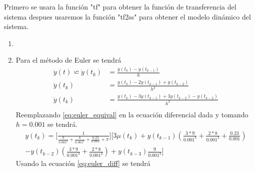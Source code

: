 \documentclass[12pt]{article}
\begin{document}
\begin{enumerate}
        
    Primero se usara la función "tf" para obtener la función de transferencia del sistema despues usaremos la función "tf2ss" para obtener el modelo dinámico del sistema.
    \begin{enumerate}
        \item 
        

        
        \item Para el método de Euler se tendrá
        \begin{equation}
            \begin{split}
                \dot{y}(t)\backsimeq \dot{y}(t_{k})&=\frac{y(t_{k})-y(t_{k-1})}{h}\\
                \ddot{y}(t_{k})&=\frac{y(t_{k})-2y(t_{k-1})+y(t_{k-2})}{h^2}\\
                \dddot{y}(t_{k})&=\frac{y(t_{k})-3y(t_{k-1})+3y(t_{k-2})-y(t_{k-2})}{h^3}\\
            \end{split}
            \label{eq:euler_equival}
        \end{equation}
        Reemplazando \ref{eq:euler_equival} en la ecuación diferencial dada y tomando $h= 0.001$ se tendrá.
        \begin{equation}
            \begin{split}
                y(t_k)=\lbrack\frac{1}{\frac{9}{0.001^3}+\frac{8}{0.001^2}+\frac{0.23}{0.001}+\pi}\rbrack\lbrack 3\mu(t_k) +y(t_{k-1})(\frac{3*9}{0.001^3}+\frac{2*8}{0.001^2}+\frac{0.23}{0.001})\\-y(t_{k-2})(\frac{3*9}{0.001^3}+\frac{2*8}{0.001^2})+y(t_{k-3})\frac{9}{0.001^3}\rbrack
            \end{split}
            \label{eq:euler_diff}
        \end{equation}
        Usando la ecuación \ref{eq:euler_diff} se tendrá


\end{enumerate}
\end{enumerate}
\end{document}
